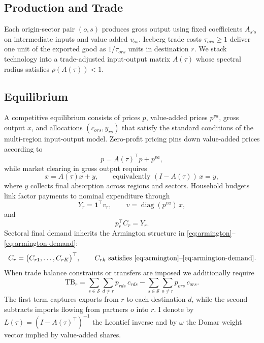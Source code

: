 \documentclass[12pt]{article}
\begin{document}
\subsection{Production and Trade}
Each origin-sector pair $(o,s)$ produces gross output using fixed coefficients $A_{s's}$ on intermediate inputs and value added $v_{os}$. Iceberg trade costs $\tau_{ors}\geq 1$ deliver one unit of the exported good as $1/\tau_{ors}$ units in destination $r$. We stack technology into a trade-adjusted input-output matrix $A(\tau)$ whose spectral radius satisfies $\rho(A(\tau))<1$.

\subsection{Equilibrium}
A competitive equilibrium consists of prices $p$, value-added prices $p^{va}$, gross output $x$, and allocations $(c_{ors}, y_{rs})$ that satisfy the standard conditions of the multi-region input-output model. Zero-profit pricing pins down value-added prices according to
\begin{equation}
\label{eq:zp}
p = A(\tau)^{\top} p + p^{va},
\end{equation}
while market clearing in gross output requires
\begin{equation}
\label{eq:mc}
x = A(\tau) x + y,
\qquad \text{equivalently } (I-A(\tau))\,x = y,
\end{equation}
where $y$ collects final absorption across regions and sectors. Household budgets link factor payments to nominal expenditure through
\begin{equation}
\label{eq:income}
Y_r = \mathbf{1}^{\top} v_r,\qquad v = \operatorname{diag}(p^{va})\,x,
\end{equation}
and
\begin{equation}
\label{eq:budget}
p_r^{\top} C_r = Y_r.
\end{equation}
Sectoral final demand inherits the Armington structure in \eqref{eq:armington}--\eqref{eq:armington-demand}:
\begin{equation}
\label{eq:final-demand}
C_r = \bigl(C_{r1},\ldots,C_{rK}\bigr)^{\top},\qquad C_{rk}\ \text{satisfies \eqref{eq:armington}--\eqref{eq:armington-demand}}.
\end{equation}
When trade balance constraints or transfers are imposed we additionally require
\begin{equation}
\label{eq:tb}
\mathrm{TB}_r = \sum_{s\in\mathcal{S}}\sum_{d\neq r} p_{rds}\,c_{rds} - \sum_{s\in\mathcal{S}}\sum_{o\neq r} p_{ors}\,c_{ors}.
\end{equation}
The first term captures exports from $r$ to each destination $d$, while the second subtracts imports flowing from partners $o$ into $r$.
I denote by $L(\tau) = (I - A(\tau)^{\top})^{-1}$ the Leontief inverse and by $\omega$ the Domar weight vector implied by value-added shares.
\end{document}
